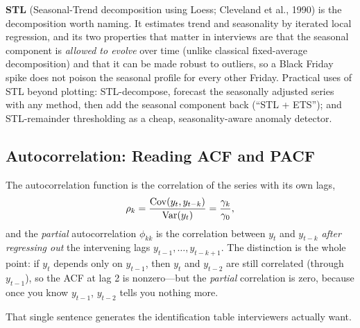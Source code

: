 \textbf{STL} (Seasonal-Trend decomposition using Loess; Cleveland et al., 1990) is the decomposition worth naming. It estimates trend and seasonality by iterated local regression, and its two properties that matter in interviews are that the seasonal component is \emph{allowed to evolve} over time (unlike classical fixed-average decomposition) and that it can be made robust to outliers, so a Black Friday spike does not poison the seasonal profile for every other Friday. Practical uses of STL beyond plotting: STL-decompose, forecast the seasonally adjusted series with any method, then add the seasonal component back (``STL + ETS''); and STL-remainder thresholding as a cheap, seasonality-aware anomaly detector.

\subsection{Autocorrelation: Reading ACF and PACF}

The autocorrelation function is the correlation of the series with its own lags,
\begin{equation}
\rho_k = \frac{\operatorname{Cov}(y_t, y_{t-k})}{\operatorname{Var}(y_t)} = \frac{\gamma_k}{\gamma_0},
\end{equation}
and the \emph{partial} autocorrelation $\phi_{kk}$ is the correlation between $y_t$ and $y_{t-k}$ \emph{after regressing out} the intervening lags $y_{t-1}, \ldots, y_{t-k+1}$. The distinction is the whole point: if $y_t$ depends only on $y_{t-1}$, then $y_t$ and $y_{t-2}$ are still correlated (through $y_{t-1}$), so the ACF at lag 2 is nonzero---but the \emph{partial} correlation is zero, because once you know $y_{t-1}$, $y_{t-2}$ tells you nothing more.

That single sentence generates the identification table interviewers actually want.

